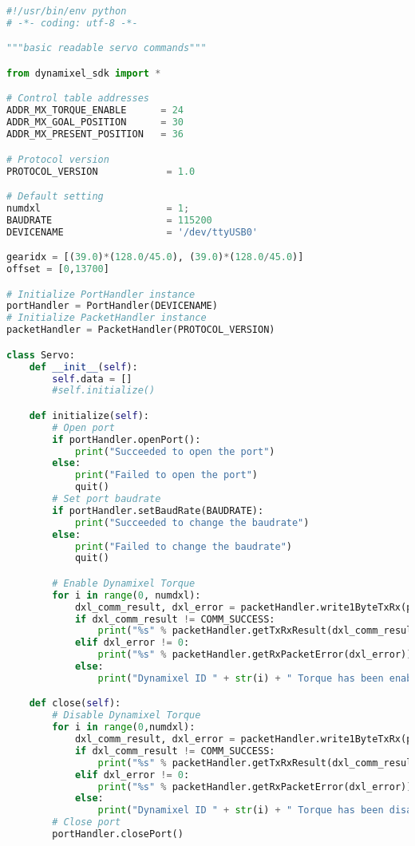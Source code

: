 \begin{lstlisting}[frame=lines,language=Python, caption=meiosis\_servo.py]
#!/usr/bin/env python
# -*- coding: utf-8 -*-

"""basic readable servo commands"""

from dynamixel_sdk import *

# Control table addresses
ADDR_MX_TORQUE_ENABLE      = 24
ADDR_MX_GOAL_POSITION      = 30
ADDR_MX_PRESENT_POSITION   = 36

# Protocol version
PROTOCOL_VERSION            = 1.0

# Default setting
numdxl                      = 1;
BAUDRATE                    = 115200
DEVICENAME                  = '/dev/ttyUSB0'

gearidx = [(39.0)*(128.0/45.0), (39.0)*(128.0/45.0)]
offset = [0,13700]

# Initialize PortHandler instance
portHandler = PortHandler(DEVICENAME)
# Initialize PacketHandler instance
packetHandler = PacketHandler(PROTOCOL_VERSION)

class Servo:
    def __init__(self):
        self.data = []
        #self.initialize()

    def initialize(self):
        # Open port
        if portHandler.openPort():
            print("Succeeded to open the port")
        else:
            print("Failed to open the port")
            quit()
        # Set port baudrate
        if portHandler.setBaudRate(BAUDRATE):
            print("Succeeded to change the baudrate")
        else:
            print("Failed to change the baudrate")
            quit()

        # Enable Dynamixel Torque
        for i in range(0, numdxl):
            dxl_comm_result, dxl_error = packetHandler.write1ByteTxRx(portHandler, i, ADDR_MX_TORQUE_ENABLE, 1)
            if dxl_comm_result != COMM_SUCCESS:
                print("%s" % packetHandler.getTxRxResult(dxl_comm_result))
            elif dxl_error != 0:
                print("%s" % packetHandler.getRxPacketError(dxl_error))
            else:
                print("Dynamixel ID " + str(i) + " Torque has been enabled.")

    def close(self):
        # Disable Dynamixel Torque
        for i in range(0,numdxl):
            dxl_comm_result, dxl_error = packetHandler.write1ByteTxRx(portHandler, i, ADDR_MX_TORQUE_ENABLE, 0)
            if dxl_comm_result != COMM_SUCCESS:
                print("%s" % packetHandler.getTxRxResult(dxl_comm_result))
            elif dxl_error != 0:
                print("%s" % packetHandler.getRxPacketError(dxl_error))
            else:
                print("Dynamixel ID " + str(i) + " Torque has been disabled.")
        # Close port
        portHandler.closePort()


\end{lstlisting}
